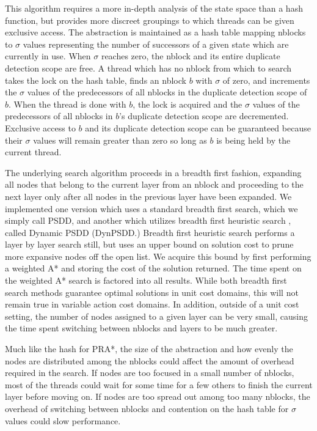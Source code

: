 \documentclass{article}
\begin{document}
This algorithm requires a more in-depth analysis of the state space than a hash function, but provides more discreet groupings to which threads can be given exclusive access. The abstraction is maintained as a hash table mapping nblocks to $\sigma$ values representing the number of successors of a given state which are currently in use. When $\sigma$ reaches zero, the nblock and its entire duplicate detection scope are free. A thread which has no nblock from which to search takes the lock on the hash table, finds an nblock $b$ with $\sigma$ of zero, and increments the $\sigma$ values of the predecessors of all nblocks in the duplicate detection scope of $b$. When the thread is done with $b$, the lock is acquired and the $\sigma$ values of the predecessors of all nblocks in $b$'s duplicate detection scope are decremented. Exclusive access to $b$ and its duplicate detection scope can be guaranteed because their $\sigma$ values will remain greater than zero so long as $b$ is being held by the current thread.

The underlying search algorithm proceeds in a breadth first fashion, expanding all nodes that belong to the current layer from an nblock and proceeding to the next layer only after all nodes in the previous layer have been expanded. We implemented one version which uses a standard breadth first search, which we simply call PSDD, and another which utilizes breadth first heuristic search \cite{zhou:bhs}, called Dynamic PSDD (DynPSDD.) Breadth first heuristic search performs a layer by layer search still, but uses an upper bound on solution cost to prune more expansive nodes off the open list. We acquire this bound by first performing a weighted A* and storing the cost of the solution returned. The time spent on the weighted A* search is factored into all results. While both breadth first search methods guarantee optimal solutions in unit cost domains, this will not remain true in variable action cost domains. In addition, outside of a unit cost setting, the number of nodes assigned to a given layer can be very small, causing the time spent switching between nblocks and layers to be much greater.

Much like the hash for PRA*, the size of the abstraction and how evenly the nodes are distributed among the nblocks could affect the amount of overhead required in the search. If nodes are too focused in a small number of nblocks, most of the threads could wait for some time for a few others to finish the current layer before moving on. If nodes are too spread out among too many nblocks, the overhead of switching between nblocks and contention on the hash table for $\sigma$ values could slow performance.
\end{document}
